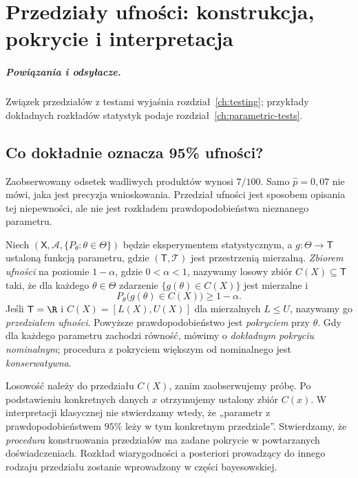 \chapter{Przedziały ufności: konstrukcja, pokrycie i interpretacja}
\label{ch:confidence-intervals}
\paragraph{Powiązania i odsyłacze.} Związek przedziałów z testami wyjaśnia rozdział~\ref{ch:testing}; przykłady dokładnych rozkładów statystyk podaje rozdział~\ref{ch:parametric-tests}.


\section{Co dokładnie oznacza 95\% ufności?}
Zaobserwowany odsetek wadliwych produktów wynosi $7/100$. Samo
$\widehat p=0{,}07$ nie mówi, jaka jest precyzja wnioskowania.
Przedział ufności jest sposobem opisania tej niepewności, ale
nie jest rozkładem prawdopodobieństwa nieznanego parametru.

\begin{definicja}\label{def:confidence-set}
Niech $(\mathsf X,\mathcal A,\{P_\theta:\theta\in\Theta\})$
będzie eksperymentem statystycznym, a
$g:\Theta\to\mathsf T$ ustaloną funkcją parametru,
gdzie $(\mathsf T,\mathcal T)$ jest przestrzenią mierzalną.
\emph{Zbiorem ufności} na poziomie $1-\alpha$, gdzie
$0<\alpha<1$, nazywamy losowy zbiór $C(X)\subseteq\mathsf T$
taki, że dla każdego $\theta\in\Theta$ zdarzenie
$\{g(\theta)\in C(X)\}$ jest mierzalne i
\[
 P_\theta\bigl(g(\theta)\in C(X)\bigr)\ge1-\alpha.
\]
Jeśli $\mathsf T=\R$ i $C(X)=[L(X),U(X)]$ dla
mierzalnych $L\le U$, nazywamy go \emph{przedziałem ufności}.
Powyższe prawdopodobieństwo jest \emph{pokryciem} przy $\theta$.
Gdy dla każdego parametru zachodzi równość, mówimy o
\emph{dokładnym pokryciu nominalnym}; procedura z pokryciem
większym od nominalnego jest \emph{konserwatywna}.
\end{definicja}

Losowość należy do przedziału $C(X)$, zanim zaobserwujemy próbę.
Po podstawieniu konkretnych danych $x$ otrzymujemy ustalony zbiór
$C(x)$. W interpretacji klasycznej nie stwierdzamy wtedy, że
„parametr z prawdopodobieństwem $95\%$ leży w tym konkretnym
przedziale”. Stwierdzamy, że \emph{procedura} konstruowania
przedziałów ma zadane pokrycie w powtarzanych doświadczeniach.
Rozkład wiarygodności a posteriori prowadzący do innego rodzaju
przedziału zostanie wprowadzony w części bayesowskiej.

